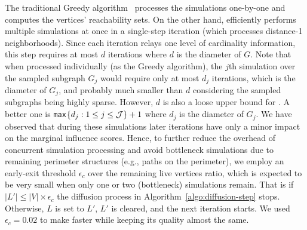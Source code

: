  
 
The traditional Greedy algorithm~\cite{kempe2003maximizing} processes the simulations one-by-one and computes the vertices' reachability sets. On the other hand, \acro efficiently performs multiple simulations at once in a single-step iteration (which processes distance-1 neighborhoods). Since each iteration relays one level of cardinality information, this step requires at most $d$ iterations where $d$ is the diameter of $G$. Note that when processed individually (as the Greedy algorithm), the $j$th simulation over the sampled subgraph $G_j$ would require only at most $d_j$ iterations, which is the diameter of $G_j$, and probably much smaller than $d$ considering the sampled subgraphs being highly sparse. However, $d$ is also a loose upper bound for \acro. A better one is {\tt max}$\{d_j: 1 \leq j \leq {\cal J}\} + 1$ where $d_j$ is the diameter of $G_j$. We have observed that during these simulations later iterations have only a minor impact on the marginal influence scores. Hence, to further reduce the overhead of concurrent simulation processing and avoid bottleneck simulations due to remaining perimeter structures (e.g., paths on the perimeter), we employ an early-exit threshold $\epsilon_c$ over the remaining live vertices ratio, which is expected to be very small when only one or two (bottleneck) simulations remain. That is if $|L'| \leq |V| \times \epsilon_c$ the diffusion process in Algorithm~\ref{algo:diffusion-step} stops. Otherwise, $L$ is set to $L'$, $L'$ is cleared, and the next iteration starts. We used $\epsilon_c = 0.02$ to make \acro faster while keeping its quality almost the same.

